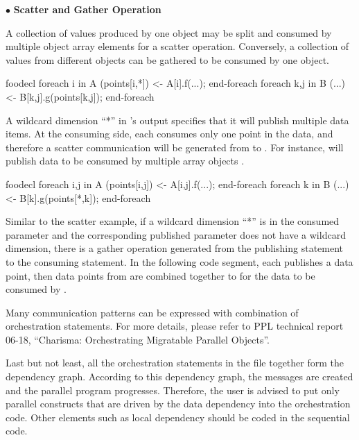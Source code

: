 $\bullet$ {\bf Scatter and Gather Operation}

A collection of values produced by one object may be split and consumed by
multiple object array elements for a scatter operation. Conversely, a collection
of values from different objects can be gathered to be consumed by one object.

\begin{SaveVerbatim}{foodecl}
  foreach i in A
    (points[i,*]) <- A[i].f(...);
  end-foreach
  foreach k,j in B
    (...) <- B[k,j].g(points[k,j]);
  end-foreach
\end{SaveVerbatim}

A wildcard dimension ``*'' in 's output  specifies
that it will publish multiple data items. At the consuming side, each
 consumes only one point in the data, and therefore a scatter
communication will be generated from  to . For instance,
 will publish data  to be consumed by multiple
array objects .  

\begin{SaveVerbatim}{foodecl}
  foreach i,j in A
    (points[i,j]) <- A[i,j].f(...);
  end-foreach
  foreach k in B
    (...) <- B[k].g(points[*,k]);
  end-foreach
\end{SaveVerbatim}


Similar to the scatter example, if a wildcard dimension ``*'' is in the
consumed parameter and the corresponding published parameter does not have a
wildcard dimension, there is a gather operation generated from the publishing
statement to the consuming statement. In the following code segment, each 
 publishes a data point, then data points from  are
combined together to for the data to be consumed by .  

Many communication patterns can be expressed with combination of orchestration
statements. For more details, please refer to PPL technical report 06-18,
``Charisma: Orchestrating Migratable Parallel Objects''.

Last but not least, all the orchestration statements in the  file
together form the dependency graph. According to this dependency graph, the
messages are created and the parallel program progresses. Therefore, the user is
advised to put only parallel constructs that are driven by the data dependency
into the orchestration code. Other elements such as local dependency should be
coded in the sequential code. 

